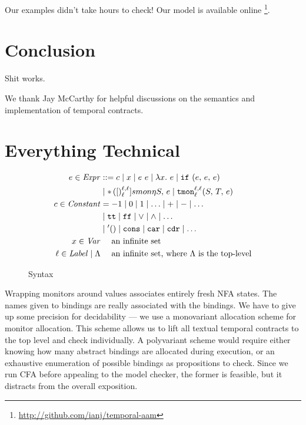 \documentclass[preprint,onecolumn,9pt]{sigplanconf} %
\begin{document}
Our examples didn't take hours to check!
%
Our model is available online \footnote{\url{http://github.com/ianj/temporal-aam}}.

\section{Conclusion}

Shit works.

\acks We thank Jay McCarthy for helpful discussions on the semantics
and implementation of temporal contracts.


\section{Everything Technical}\label{sec:technical}

\begin{figure}
\begin{align*}
e \in \mathit{Expr} &::=
      c
 \mid x
 \mid e\ e
 \mid \lambda x.\ e
 \mid {\tt if}{\ }({e,\,e,\,e}) \\
&\mid {\tt *}{\,}({[})^{\ell,\ell}_{\ell}]{smon}{\eta}{S,\, e}
 \mid {\tt tmon}{^{\ell,\ell}_{\ell}}({S,\,T,\,e}) \\
c \in \mathit{Constant} &=
 -1 \mid 0 \mid 1 \mid \ldots \mid + \mid - \mid \ldots \\
&\mid {\tt tt} \mid {\tt ff} \mid \vee \mid \wedge \mid \ldots \\
&\mid {\tt '()} \mid \tt cons \mid {\tt car} \mid {\tt cdr} \mid \ldots \\
x \in \mathit{Var} &\quad\text{ an infinite set} \\
\ell \in \mathit{Label} \mid \Lambda &\quad\text{ an infinite set, where $\Lambda$ is the top-level}
\end{align*}
\caption{Syntax}
\label{fig:syntax}
\end{figure}

Wrapping monitors around values associates entirely fresh NFA states.
%
The names given to bindings are really associated with the bindings.
%
We have to give up some precision for decidability --- we use a monovariant allocation scheme for monitor allocation.
%
This scheme allows us to lift all textual temporal contracts to the top level and check individually.
%
A polyvariant scheme would require either knowing how many abstract bindings are allocated during execution, or an exhaustive enumeration of possible bindings as propositions to check.
%
Since we run CFA before appealing to the model checker, the former is feasible, but it distracts from the overall exposition.
\end{document}
